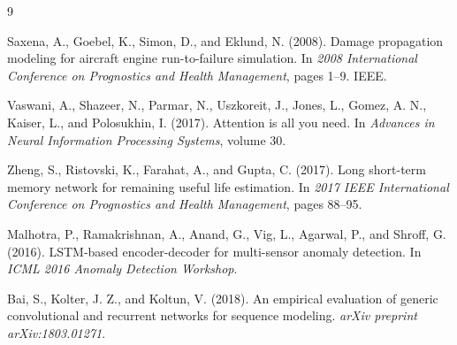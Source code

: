 \documentclass[11pt,a4paper]{article}
\begin{document}
\begin{thebibliography}{9}

Saxena, A., Goebel, K., Simon, D., and Eklund, N. (2008).
\newblock Damage propagation modeling for aircraft engine run-to-failure simulation.
\newblock In \emph{2008 International Conference on Prognostics and Health Management}, pages 1--9. IEEE.

Vaswani, A., Shazeer, N., Parmar, N., Uszkoreit, J., Jones, L., Gomez, A. N., Kaiser, L., and Polosukhin, I. (2017).
\newblock Attention is all you need.
\newblock In \emph{Advances in Neural Information Processing Systems}, volume 30.

Zheng, S., Ristovski, K., Farahat, A., and Gupta, C. (2017).
\newblock Long short-term memory network for remaining useful life estimation.
\newblock In \emph{2017 IEEE International Conference on Prognostics and Health Management}, pages 88--95.

Malhotra, P., Ramakrishnan, A., Anand, G., Vig, L., Agarwal, P., and Shroff, G. (2016).
\newblock LSTM-based encoder-decoder for multi-sensor anomaly detection.
\newblock In \emph{ICML 2016 Anomaly Detection Workshop}.

Bai, S., Kolter, J. Z., and Koltun, V. (2018).
\newblock An empirical evaluation of generic convolutional and recurrent networks for sequence modeling.
\newblock \emph{arXiv preprint arXiv:1803.01271}.

\end{thebibliography}
\end{document}

